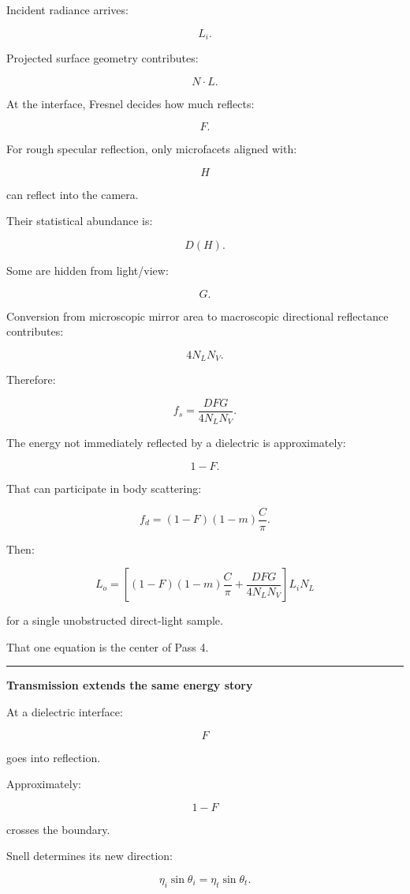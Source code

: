 Incident radiance arrives:

\[
L_i.
\]

Projected surface geometry contributes:

\[
N\cdot L.
\]

At the interface, Fresnel decides how much reflects:

\[
F.
\]

For rough specular reflection, only microfacets aligned with:

\[
H
\]

can reflect into the camera.

Their statistical abundance is:

\[
D(H).
\]

Some are hidden from light/view:

\[
G.
\]

Conversion from microscopic mirror area to macroscopic directional reflectance contributes:

\[
4N_LN_V.
\]

Therefore:

\[
f_s=
\frac{DFG}{4N_LN_V}.
\]

The energy not immediately reflected by a dielectric is approximately:

\[
1-F.
\]

That can participate in body scattering:

\[
f_d=
(1-F)(1-m)\frac{C}{\pi}.
\]

Then:

\[
\boxed{
L_o
=
\left[
(1-F)(1-m)
\frac{C}{\pi}
+
\frac{DFG}
{4N_LN_V}
\right]
L_iN_L
}
\]

for a single unobstructed direct-light sample.

That one equation is the center of Pass 4.

\begin{center}\rule{0.5\linewidth}{0.5pt}\end{center}

\textbf{Transmission extends the same energy story}

At a dielectric interface:

\[
F
\]

goes into reflection.

Approximately:

\[
1-F
\]

crosses the boundary.

Snell determines its new direction:

\[
\eta_i\sin\theta_i
=
\eta_t\sin\theta_t.
\]

